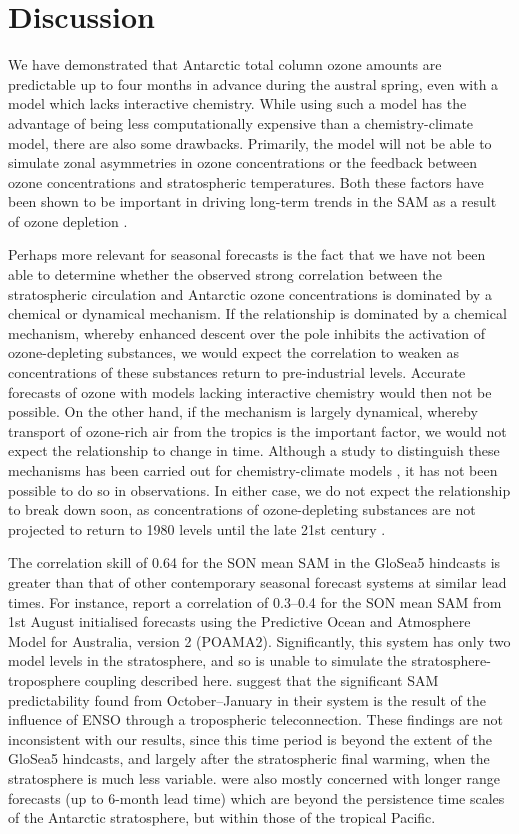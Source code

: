 \section{Discussion}

We have demonstrated that Antarctic total column ozone amounts are predictable
up to four months in advance during the austral spring, even with a model which
lacks interactive chemistry. While using such a model has the advantage of being
less computationally expensive than a chemistry-climate model, there are also
some drawbacks. Primarily, the model will not be able to simulate zonal
asymmetries in ozone concentrations or the feedback between ozone concentrations
and stratospheric temperatures. Both these factors have been shown to be
important in driving long-term trends in the SAM as a result of ozone depletion
\citep{Thompson2002a, Crook2008, Waugh2009}.

Perhaps more relevant for seasonal forecasts is the fact that we have not been
able to determine whether the observed strong correlation between the
stratospheric circulation and Antarctic ozone concentrations is dominated by a
chemical or dynamical mechanism. If the relationship is dominated by a chemical
mechanism, whereby enhanced descent over the pole inhibits the activation of
ozone-depleting substances, we would expect the correlation to weaken as
concentrations of these substances return to pre-industrial levels. Accurate
forecasts of ozone with models lacking interactive chemistry would then not be
possible. On the other hand, if the mechanism is largely dynamical, whereby
transport of ozone-rich air from the tropics is the important factor, we would
not expect the relationship to change in time.  Although a study to distinguish
these mechanisms has been carried out for chemistry-climate models
\citep{Garny2011}, it has not been possible to do so in observations. In either
case, we do not expect the relationship to break down soon, as concentrations of
ozone-depleting substances are not projected to return to 1980 levels until the
late 21st century \citep{WMO2010}.

The correlation skill of 0.64 for the SON mean SAM in the GloSea5 hindcasts is
greater than that of other contemporary seasonal forecast systems at similar
lead times. For instance, \citet{Lim2013} report a correlation of 0.3--0.4 for
the SON mean SAM from 1st August initialised forecasts using the Predictive
Ocean and Atmosphere Model for Australia, version 2 (POAMA2). Significantly,
this system has only two model levels in the stratosphere, and so is unable to
simulate the stratosphere-troposphere coupling described here. \citet{Lim2013}
suggest that the significant SAM predictability found from October--January in
their system is the result of the influence of ENSO through a tropospheric
teleconnection.  These findings are not inconsistent with our results, since
this time period is beyond the extent of the GloSea5 hindcasts, and largely
after the stratospheric final warming, when the stratosphere is much less
variable. \citet{Lim2013} were also mostly concerned with longer range forecasts
(up to 6-month lead time) which are beyond the persistence time scales of the
Antarctic stratosphere, but within those of the tropical Pacific.

